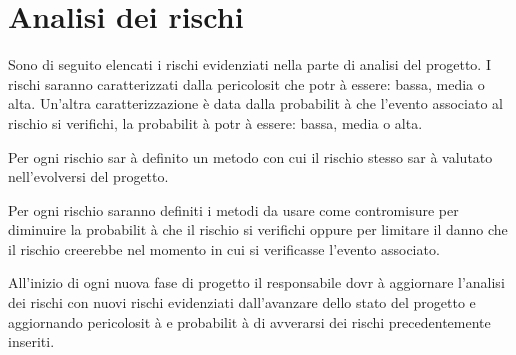 \section{Analisi dei rischi}

Sono di seguito elencati i rischi evidenziati nella parte di analisi del progetto. 
I rischi saranno caratterizzati dalla pericolosit che potr \`{a} essere: bassa, media o alta.
Un'altra caratterizzazione  \`{e} data dalla probabilit \`{a} che l'evento associato al rischio si verifichi, la probabilit \`{a} potr \`{a} essere: bassa, media o alta.

Per ogni rischio sar \`{a} definito un metodo con cui il rischio stesso sar \`{a} valutato nell'evolversi del progetto.

Per ogni rischio saranno definiti i metodi da usare come contromisure per diminuire la probabilit \`{a} che il rischio si verifichi oppure per limitare il danno che il rischio creerebbe nel momento in cui si verificasse l'evento associato.

All'inizio di ogni nuova fase di progetto il responsabile dovr \`{a} aggiornare l'analisi dei rischi con nuovi rischi evidenziati dall'avanzare dello stato del progetto e aggiornando pericolosit \`{a} e probabilit \`{a} di avverarsi dei rischi precedentemente inseriti.

